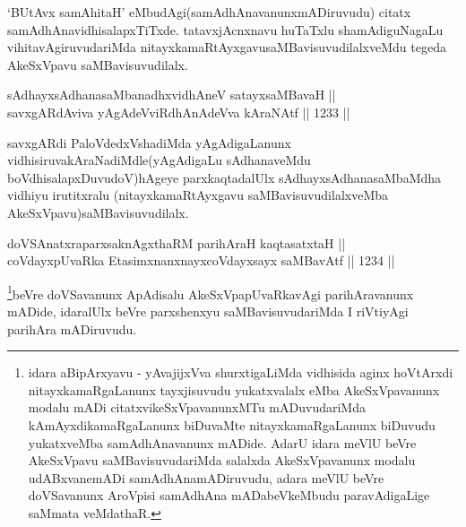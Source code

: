 \begin{artha}
`BUtAvx samAhitaH' eMbudAgi(samAdhAnavanunx\break mADiruvudu) citatx samAdhAnavidhisalapxTiTxde. tatavxjAcnxnavu huTaTxlu shamAdiguNagaLu vihitavAgiruvudariMda nitayxkamaRtAyxgavu\break saMBavisuvudilalxveMdu tegeda AkeSxVpavu saMBavisuvudilalx.
\end{artha}


\begin{shl}
sAdhayxsAdhanasaMbanadhxvidhAneV satayxsaMBavaH ||  \\
savxgARdAviva yAgAdeVviRdhAnAdeVva kAraNAtf \hfill || 1233 ||  
\end{shl}

\begin{artha}
savxgARdi PaloVdedxVshadiMda yAgAdigaLanunx vidhisiruva\break kAraNadiMdle(yAgAdigaLu sAdhanaveMdu boVdhisalapxDuvudoV)\break hAgeye parxkaqtadalUlx sAdhayxsAdhanasaMbaMdha vidhiyu irutitxralu (nitayxkamaRtAyxgavu saMBavisuvudilalxveMba AkeSxVpavu)saMBavisu\-\break vudilalx.
\end{artha}


\begin{shl}
doVSAnatxraparxsaknAgxthaRM parihAraH kaqtasatxtaH || \\
coVdayxpUvaRka EtasimxnanxnayxcoVdayxsayx saMBavAtf \hfill || 1234 ||   
\end{shl}

\begin{artha}
\footnote{idara aBipArxyavu - yAvajijxVva shurxtigaLiMda vidhisida aginx hoVtArxdi nitayxkamaRgaLanunx tayxjisuvudu yukatxvalalx eMba AkeSxVpavanunx modalu mADi citatxvikeSxVpavanunxMTu mADuvudariMda kAmAyxdikamaRgaLanunx biDuvaMte nitayxkamaRgaLanunx biDuvudu yukatxveMba samAdhAnavanunx mADide. AdarU idara meVlU beVre AkeSxVpavu saMBavisuvudariMda salalxda AkeSxVpavanunx modalu udABxvanemADi samAdhAnamADiruvudu, adara meVlU beVre doVSavanunx AroVpisi samAdhAna mADabeVkeMbudu  paravAdigaLige saMmata veMdathaR.}beVre doVSavanunx ApAdisalu AkeSxVpapUvaRkavAgi parihAravanunx mADide, idaralUlx beVre parxshenxyu saMBavisuvudariMda I riVtiyAgi parihAra mADiruvudu.
\end{artha}



